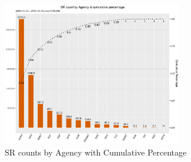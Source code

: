 \documentclass[linenumber]{jdsart}
\begin{document}
\begin{figure}[tbp]
	\centering
	\includegraphics[width=0.7\textwidth]{SRs_by_Agency.pdf}
  	\caption{SR counts by Agency with Cumulative Percentage}
	\label{fig:SRcountbyAgency}
\end{figure}

\end{document}
